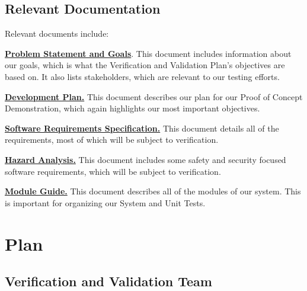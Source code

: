 \documentclass[12pt, titlepage]{article}
\begin{document}
\subsection{Relevant Documentation}

Relevant documents include:

\href{https://github.com/felix-hurst/Ad-Natura/blob/main/docs/ProblemStatementAndGoals/ProblemStatement.pdf}{\bf{Problem Statement and Goals}}. This document includes information about our goals, which is what the Verification and Validation Plan’s objectives are based on. It also lists stakeholders, which are relevant to our testing efforts.

\href{https://github.com/felix-hurst/Ad-Natura/blob/main/docs/DevelopmentPlan/DevelopmentPlan.pdf}{\bf{Development Plan.}} This document describes our plan for our Proof of Concept Demonstration, which again highlights our most important objectives.

\href{https://github.com/felix-hurst/Ad-Natura/blob/main/docs/SRS/SRS.pdf}{\bf{Software Requirements Specification.}} This document details all of the requirements, most of which will be subject to verification.

\href{https://github.com/felix-hurst/Ad-Natura/blob/main/docs/HazardAnalysis/HazardAnalysis.pdf}{\bf{Hazard Analysis.}} This document includes some safety and security focused software requirements, which will be subject to verification.

\href{https://github.com/felix-hurst/Ad-Natura/blob/main/docs/Design/SoftArchitecture/MG.pdf}{\bf{Module Guide.}} This document describes all of the modules of our system. This is important for organizing our System and Unit Tests.

\section{Plan}

\subsection{Verification and Validation Team}
\end{document}

